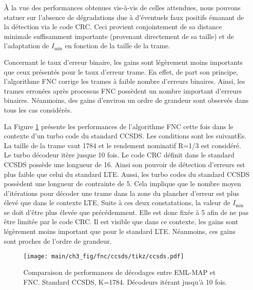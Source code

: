 À la vue des performances obtenues vis-à-vis de celles attendues, nous pouvons statuer sur l'absence de 
dégradations due à d'éventuels faux positifs émanant de la détection via le code CRC. Ceci provient conjointement de sa
distance minimale suffisamment importante (provenant directement de sa taille) et de l'adaptation de $I_{\text{min}}$ en 
fonction de la taille de la trame.

Concernant le taux d'erreur binaire, les gains sont légèrement moins importants que ceux présentés pour le taux d'erreur trame. En effet,
de part son principe, l'algorithme FNC corrige les trames à faible nombre d'erreurs binaires. Ainsi, les trames erronées 
après processus FNC possèdent un nombre important d'erreurs binaires. Néanmoins, des gains d'environ un ordre de grandeur 
sont observés dans tous les cas considérés. 

La Figure \ref{fig:fnc_ccsds} présente les performances de l'algorithme FNC cette fois dans le contexte d'un turbo code 
du standard CCSDS. Les conditions sont les suivantEs. La taille de la trame vaut 1784 et le rendement nominatif R=1/3 est 
considéré. Le turbo décodeur itère jusque 10 fois. Le code CRC définit dans le standard CCSDS possède une longueur de 16.
Ainsi son pouvoir de détection d'erreurs est plus faible que celui du standard LTE. Aussi, les turbo codes du 
standard CCSDS possèdent une longueur de contrainte de 5. Cela implique que le nombre moyen d'itérations pour décoder une trame dans 
la zone du plancher d'erreur est plus élevé que dans le contexte LTE. Suite à ces deux constatations, la valeur de 
$I_\text{min}$ se doit d'être plus élevée que précédemment. Elle est donc fixée à 5 afin de ne pas être limitée par le code CRC. 
Il est visible que dans ce contexte, les gains sont légèrement moins important que pour le standard LTE. Néanmoins, ces gains
sont proches de l'ordre de grandeur.

\begin{figure}[!b]
	\centering
	\texttt{[image: main/ch3\_fig/fnc/ccsds/tikz/ccsds.pdf]}
	\caption{Comparaison de performances de décodages entre EML-MAP et FNC. Standard CCSDS, K=1784.
	Décodeurs itérant jusqu'à 10 fois. \label{fig:fnc_ccsds}}
\end{figure}

